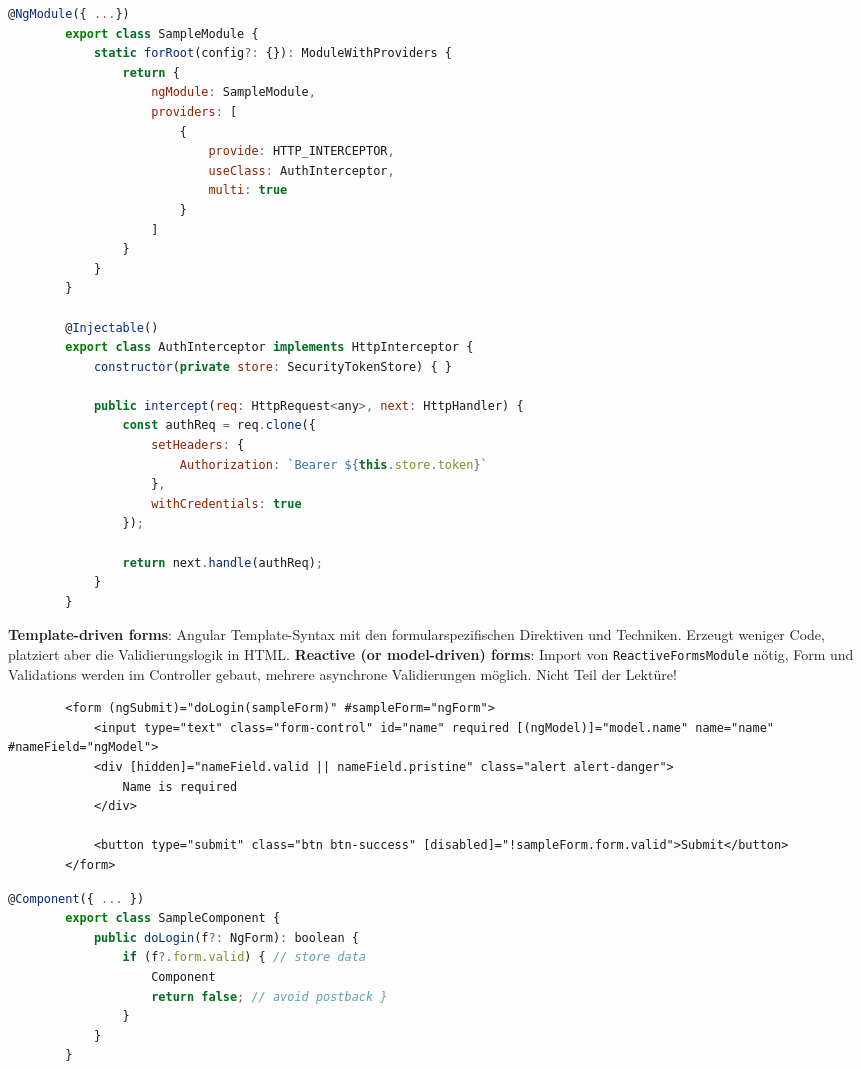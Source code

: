 \documentclass[10pt,landscape]{article}
\begin{document}
\begin{multicols}{2}
        \begin{lstlisting}[language=JavaScript]
        @NgModule({ ...})
        export class SampleModule {
            static forRoot(config?: {}): ModuleWithProviders {
                return {
                    ngModule: SampleModule,
                    providers: [
                        {
                            provide: HTTP_INTERCEPTOR,
                            useClass: AuthInterceptor,
                            multi: true
                        }
                    ]
                }
            }
        }

        @Injectable()
        export class AuthInterceptor implements HttpInterceptor {
            constructor(private store: SecurityTokenStore) { }

            public intercept(req: HttpRequest<any>, next: HttpHandler) {
                const authReq = req.clone({
                    setHeaders: {
                        Authorization: `Bearer ${this.store.token}`
                    },
                    withCredentials: true
                });

                return next.handle(authReq);
            }
        }
        \end{lstlisting}

        \textbf{Template-driven forms}: Angular Template-Syntax mit den formularspezifischen Direktiven und Techniken.
        Erzeugt weniger Code, platziert aber die Validierungslogik in HTML.
        \textbf{Reactive (or model-driven) forms}: Import von \lstinline{ReactiveFormsModule} nötig, Form und Validations werden im Controller gebaut, mehrere asynchrone Validierungen möglich.
        Nicht Teil der Lektüre!

        \begin{lstlisting}
        <form (ngSubmit)="doLogin(sampleForm)" #sampleForm="ngForm">
            <input type="text" class="form-control" id="name" required [(ngModel)]="model.name" name="name" #nameField="ngModel">
            <div [hidden]="nameField.valid || nameField.pristine" class="alert alert-danger">
                Name is required
            </div>

            <button type="submit" class="btn btn-success" [disabled]="!sampleForm.form.valid">Submit</button>
        </form>
        \end{lstlisting}\begin{lstlisting}[language=JavaScript]
        @Component({ ... })
        export class SampleComponent {
            public doLogin(f?: NgForm): boolean {
                if (f?.form.valid) { // store data
                    Component
                    return false; // avoid postback }
                }
            }
        }
        \end{lstlisting}


\end{multicols}
\end{document}
